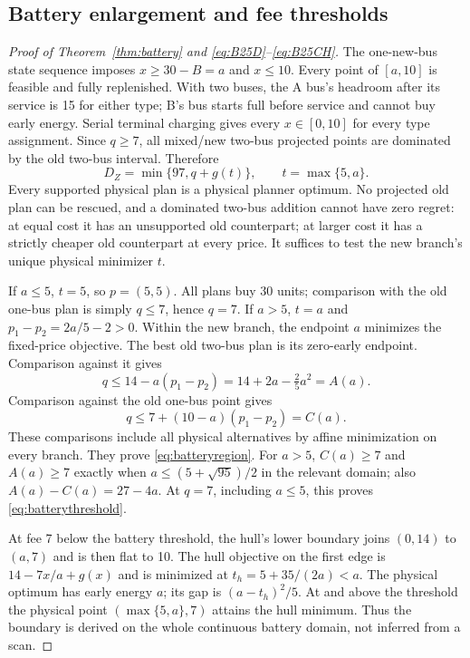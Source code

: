 \subsection{Battery enlargement and fee thresholds}\label{app:battery}
\begin{proof}[Proof of Theorem~\ref{thm:battery} and
\eqref{eq:B25D}--\eqref{eq:B25CH}]
The one-new-bus state sequence imposes $x\ge30-B=a$ and $x\le10$.
Every point of $[a,10]$ is feasible and fully replenished. With two
buses, the A bus's headroom after its service is 15 for either type;
B's bus starts full before service and cannot buy early energy. Serial
terminal charging gives every $x\in[0,10]$ for every type assignment.
Since $q\ge7$, all mixed/new two-bus projected points are dominated by
the old two-bus interval. Therefore
\[
 D_Z=\min\{97,q+g(t)\},\qquad t=\max\{5,a\}.
\]
Every supported physical plan is a physical planner optimum. No projected
old plan can be rescued, and a dominated two-bus addition cannot have
zero regret: at equal cost it has an unsupported old counterpart; at
larger cost it has a strictly cheaper old counterpart at every price.
It suffices to test the new branch's unique physical minimizer $t$.

If $a\le5$, $t=5$, so $p=(5,5)$. All plans buy 30 units; comparison
with the old one-bus plan is simply $q\le7$, hence $q=7$.
If $a>5$, $t=a$ and $p_1-p_2=2a/5-2>0$. Within the new branch,
the endpoint $a$ minimizes the fixed-price objective. The best old
two-bus plan is its zero-early endpoint. Comparison against it gives
\[
 q\le14-a(p_1-p_2)=14+2a-\tfrac25a^2=A(a).
\]
Comparison against the old one-bus point gives
\[
 q\le7+(10-a)(p_1-p_2)=C(a).
\]
These comparisons include all physical alternatives by affine minimization
on every branch. They prove \eqref{eq:batteryregion}. For $a>5$,
$C(a)\ge7$ and $A(a)\ge7$ exactly when
$a\le(5+\sqrt{95})/2$ in the relevant domain; also $A(a)-C(a)=27-4a$.
At $q=7$, including $a\le5$, this proves \eqref{eq:batterythreshold}.

At fee 7 below the battery threshold, the hull's lower boundary joins
$(0,14)$ to $(a,7)$ and is then flat to 10. The hull objective on the
first edge is $14-7x/a+g(x)$ and is minimized at
$t_h=5+35/(2a)<a$. The physical optimum has early energy $a$;
its gap is $(a-t_h)^2/5$. At and above the threshold the physical
point $(\max\{5,a\},7)$ attains the hull minimum. Thus the boundary is
derived on the whole continuous battery domain, not inferred from a scan.


\end{proof}

